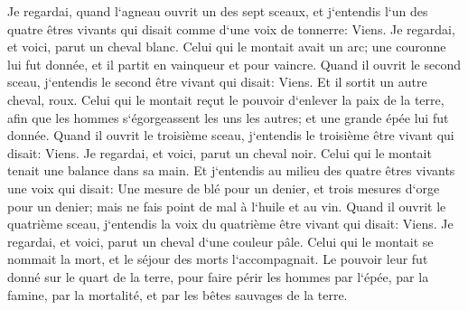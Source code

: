 \verse Je regardai, quand l`agneau ouvrit un des sept sceaux, et j`entendis l`un des quatre êtres vivants qui disait comme d`une voix de tonnerre: Viens. 
\verse Je regardai, et voici, parut un cheval blanc. Celui qui le montait avait un arc; une couronne lui fut donnée, et il partit en vainqueur et pour vaincre. 
\verse Quand il ouvrit le second sceau, j`entendis le second être vivant qui disait: Viens. 
\verse Et il sortit un autre cheval, roux. Celui qui le montait reçut le pouvoir d`enlever la paix de la terre, afin que les hommes s`égorgeassent les uns les autres; et une grande épée lui fut donnée. 
\verse Quand il ouvrit le troisième sceau, j`entendis le troisième être vivant qui disait: Viens. Je regardai, et voici, parut un cheval noir. Celui qui le montait tenait une balance dans sa main. 
\verse Et j`entendis au milieu des quatre êtres vivants une voix qui disait: Une mesure de blé pour un denier, et trois mesures d`orge pour un denier; mais ne fais point de mal à l`huile et au vin. 
\verse Quand il ouvrit le quatrième sceau, j`entendis la voix du quatrième être vivant qui disait: Viens. 
\verse Je regardai, et voici, parut un cheval d`une couleur pâle. Celui qui le montait se nommait la mort, et le séjour des morts l`accompagnait. Le pouvoir leur fut donné sur le quart de la terre, pour faire périr les hommes par l`épée, par la famine, par la mortalité, et par les bêtes sauvages de la terre. 
